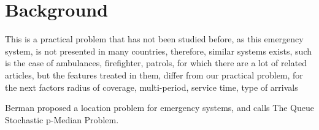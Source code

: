 \section{Background}
This is a practical problem
that has not been studied before,
as this emergency system,
is not presented in many countries,
therefore, similar systems exists,
such is the case of ambulances, firefighter, patrols,
for which there are a lot of related articles,
but the features treated in them,
differ from our practical problem,
for the next factors
radius of coverage,
multi-period,
service time,
type of arrivals

Berman %
proposed a location problem
for emergency systems,
and calls The Queue Stochastic p-Median Problem.
